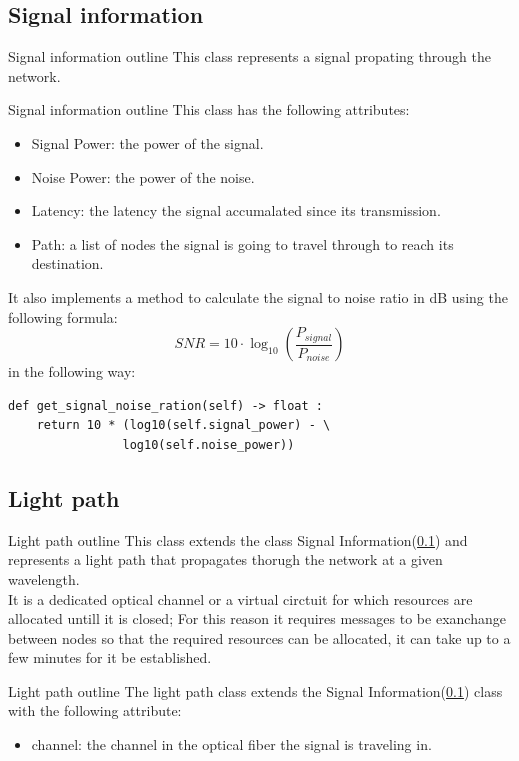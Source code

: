 \documentclass{beamer}
\begin{document}
	\subsection{Signal information}
	\label{slide:SigInf}
	\begin{frame}{Signal information outline}
		This class represents a signal propating through the network.
	\end{frame}
	\begin{frame}{Signal information outline}
		This class has the following attributes:
		\begin{itemize}
			\item Signal Power: the power of the signal.
			\item Noise Power: the power of the noise.
			\item Latency: the latency the signal accumalated since its transmission.
			\item Path: a list of nodes the signal is going to travel through to reach its destination.
		\end{itemize}
	\end{frame}
	\begin{frame}[fragile]
		It also implements a method to calculate the signal to noise ratio in dB using the following formula:
		\begin{equation}
			SNR=10 \cdot \log_{10} \left( \frac{P_{signal}}{P_{noise}} \right)
		\end{equation} \pause
		in the following way:
		\begin{verbatim}
def get_signal_noise_ration(self) -> float :
	return 10 * (log10(self.signal_power) - \
				log10(self.noise_power))
		\end{verbatim}
	\end{frame}
	\subsection{Light path}
	\begin{frame}{Light path outline}
		This class extends the class Signal Information(\ref{slide:SigInf}) and represents a light path that propagates thorugh the network at a given wavelength. \\
		It is a dedicated optical channel or a virtual circtuit for which resources are allocated untill it is closed; For this reason it requires messages to be exanchange between nodes so that the required resources can be allocated, it can take up to a few minutes for it be established.
	\end{frame}
	\begin{frame}{Light path outline}
		The light path class extends the Signal Information(\ref{slide:SigInf}) class with the following attribute:
		\begin{itemize}
			\item channel: the channel in the optical fiber the signal is traveling in.
		\end{itemize}
	\end{frame}
\end{document}
